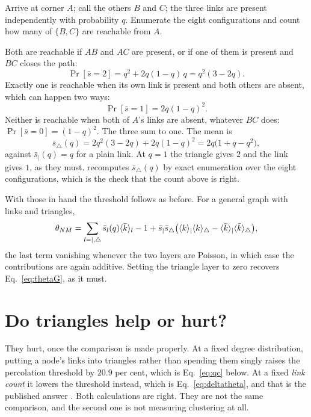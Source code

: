 Arrive at corner $A$; call the others $B$ and $C$; the three links are present
independently with probability $q$. Enumerate the eight configurations and count
how many of $\{B,C\}$ are reachable from $A$.

Both are reachable if $AB$ and $AC$ are present, or if one of them is present
and $BC$ closes the path:
\[
  \Pr[\bar s=2]=q^{2}+2q(1-q)\,q=q^{2}(3-2q).
\]
Exactly one is reachable when its own link is present and both others are
absent, which can happen two ways:
\[
  \Pr[\bar s=1]=2q(1-q)^{2}.
\]
Neither is reachable when both of $A$'s links are absent, whatever $BC$ does:
$\Pr[\bar s=0]=(1-q)^{2}$. The three sum to one. The mean is
\[
  \bar s_{\triangle}(q)=2q^{2}(3-2q)+2q(1-q)^{2}
                       =2q\bigl(1+q-q^{2}\bigr),
\]
against $\bar s_{|}(q)=q$ for a plain link. At $q=1$ the triangle gives $2$ and
the link gives $1$, as they must.  recomputes $\bar s_{\triangle}(q)$ by exact enumeration over the eight configurations, which is the check that the count above is right.

With those in hand the threshold follows as before. For a general graph with
links and triangles,
\begin{equation}
  \theta_{NM}=\sum_{l=|,\triangle}\bar s_{l}(q)\langle \bar k \rangle_{l}-1
    +\bar s_{|}\bar s_{\triangle}
     \bigl(\langle k \rangle_{|}\langle k \rangle_{\triangle}
          -\langle \bar k \rangle_{|}\langle \bar k \rangle_{\triangle}\bigr),
  \label{eq:thetaNM}
\end{equation}
the last term vanishing whenever the two layers are Poisson, in which case the
contributions are again additive. Setting the triangle layer to zero recovers
Eq.~\eqref{eq:thetaG}, as it must.

\section{Do triangles help or hurt?}
\label{sec:helporhurt}

They hurt, once the comparison is made properly. At a fixed degree distribution,
putting a node's links into triangles rather than spending them singly raises the
percolation threshold by $20.9$ per cent, which is Eq.~\eqref{eq:qc} below. At a
fixed \emph{link count} it lowers the threshold instead, which is
Eq.~\eqref{eq:deltatheta}, and that is the published answer
\citep{vazquez2024comnet}. Both calculations are right. They are not the same
comparison, and the second one is not measuring clustering at all.

